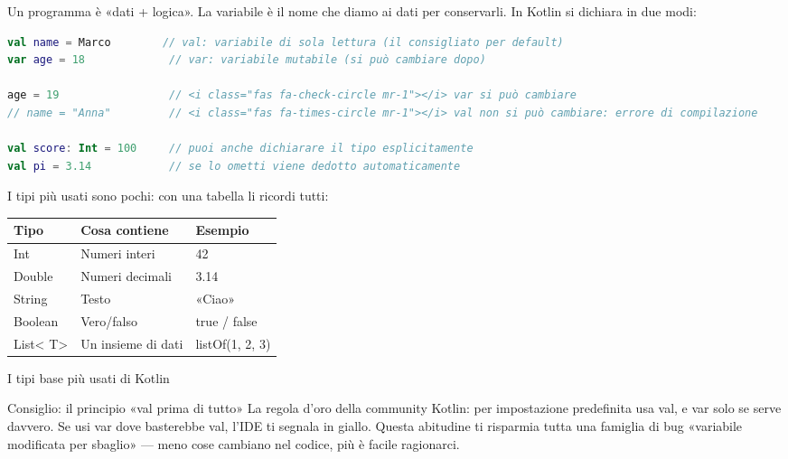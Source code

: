 


Un programma è «dati + logica». La variabile è il nome che diamo ai dati per conservarli. In Kotlin si dichiara in due modi:

\begin{lstlisting}[language=Kotlin]
val name = Marco        // val: variabile di sola lettura (il consigliato per default)
var age = 18             // var: variabile mutabile (si può cambiare dopo)

age = 19                 // <i class="fas fa-check-circle mr-1"></i> var si può cambiare
// name = "Anna"         // <i class="fas fa-times-circle mr-1"></i> val non si può cambiare: errore di compilazione

val score: Int = 100     // puoi anche dichiarare il tipo esplicitamente
val pi = 3.14            // se lo ometti viene dedotto automaticamente
\end{lstlisting}

I tipi più usati sono pochi: con una tabella li ricordi tutti:

\begin{center}
\begin{tabularx}{\linewidth}{|X|X|X|}
\hline
\textbf{Tipo} & \textbf{Cosa contiene} & \textbf{Esempio} \tabularnewline
\hline
Int & Numeri interi & 42 \tabularnewline
Double & Numeri decimali & 3.14 \tabularnewline
String & Testo & «Ciao» \tabularnewline
Boolean & Vero/falso & true / false \tabularnewline
List< T> & Un insieme di dati & listOf(1, 2, 3) \tabularnewline
\hline
\end{tabularx}
\end{center}

\begin{center}\small\color{gray}I tipi base più usati di Kotlin\end{center}

\begin{tcbinfo}{Consiglio: il principio «val prima di tutto»}
La regola d'oro della community Kotlin: per impostazione predefinita usa val, e var solo se serve davvero. Se usi var dove basterebbe val, l'IDE ti segnala in giallo. Questa abitudine ti risparmia tutta una famiglia di bug «variabile modificata per sbaglio» — meno cose cambiano nel codice, più è facile ragionarci.

\end{tcbinfo}

